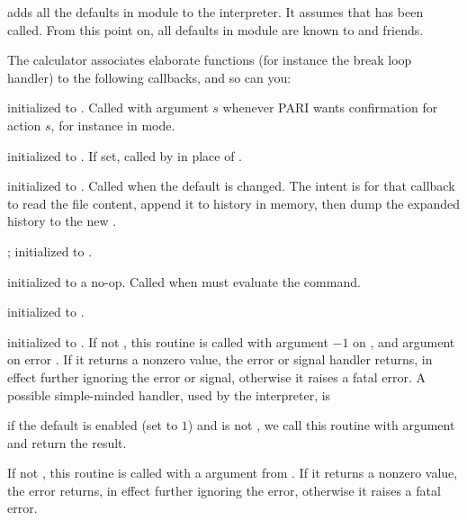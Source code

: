  adds all the defaults in
module  to the interpreter. It assumes that  has
been called. From this point on, all defaults in module  are known
to  and friends.


The  calculator associates elaborate functions (for instance the
break loop handler) to the following callbacks, and so can you:

initialized to . Called with argument $s$ whenever PARI wants
confirmation for action $s$, for instance in  mode.

initialized to . If set, called by 
in place of .

initialized to . Called when the  default
is changed. The intent is for that callback to read the file content, append
it to history in memory, then dump the expanded history to the new
.

;
initialized to .

initialized to a no-op. Called when  must evaluate the 
command.

initialized to .

initialized to . If not , this routine is called with
argument $-1$ on , and argument  on error . If
it returns a nonzero value, the error or signal handler returns, in effect
further ignoring the error or signal, otherwise it raises a fatal error.
A possible simple-minded handler, used by the  interpreter, is

 if the 
default is enabled (set to $1$) and  is not
, we call this routine with  argument and return the
result.

If not , this routine is called with a  argument
from . If it returns a nonzero value, the error returns, in
effect further ignoring the error, otherwise it raises a fatal error.

